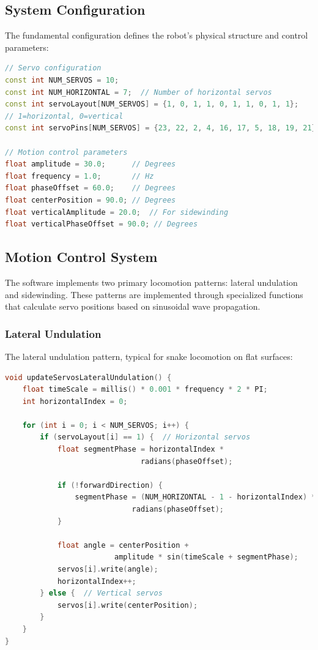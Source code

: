 \documentclass[12pt,a4paper]{report}
\begin{document}
\subsection{System Configuration}
The fundamental configuration defines the robot's physical structure and control parameters:

\begin{lstlisting}[language=C++]
// Servo configuration
const int NUM_SERVOS = 10;
const int NUM_HORIZONTAL = 7;  // Number of horizontal servos
const int servoLayout[NUM_SERVOS] = {1, 0, 1, 1, 0, 1, 1, 0, 1, 1}; 
// 1=horizontal, 0=vertical
const int servoPins[NUM_SERVOS] = {23, 22, 2, 4, 16, 17, 5, 18, 19, 21};

// Motion control parameters
float amplitude = 30.0;      // Degrees
float frequency = 1.0;       // Hz
float phaseOffset = 60.0;    // Degrees
float centerPosition = 90.0; // Degrees
float verticalAmplitude = 20.0;  // For sidewinding
float verticalPhaseOffset = 90.0; // Degrees
\end{lstlisting}

\subsection{Motion Control System}
The software implements two primary locomotion patterns: lateral undulation and sidewinding. These patterns are implemented through specialized functions that calculate servo positions based on sinusoidal wave propagation.

\subsubsection{Lateral Undulation}
The lateral undulation pattern, typical for snake locomotion on flat surfaces:

\begin{lstlisting}[language=C++]
void updateServosLateralUndulation() {
    float timeScale = millis() * 0.001 * frequency * 2 * PI;
    int horizontalIndex = 0;
    
    for (int i = 0; i < NUM_SERVOS; i++) {
        if (servoLayout[i] == 1) {  // Horizontal servos
            float segmentPhase = horizontalIndex * 
                               radians(phaseOffset);
            
            if (!forwardDirection) {
                segmentPhase = (NUM_HORIZONTAL - 1 - horizontalIndex) * 
                             radians(phaseOffset);
            }
            
            float angle = centerPosition + 
                         amplitude * sin(timeScale + segmentPhase);
            servos[i].write(angle);
            horizontalIndex++;
        } else {  // Vertical servos
            servos[i].write(centerPosition);
        }
    }
}
\end{lstlisting}
\end{document}
